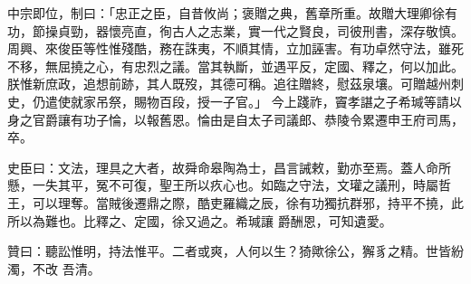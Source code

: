 \begin{pinyinscope}
 中宗即位，制曰：「忠正之臣，自昔攸尚；褒贈之典，舊章所重。故贈大理卿徐有功，節操貞勁，器懷亮直，徇古人之志業，實一代之賢良，司彼刑書，深存敬慎。周興、來俊臣等性惟殘酷，務在誅夷，不順其情，立加誣害。有功卓然守法，雖死不移，無屈撓之心，有忠烈之議。當其執斷，並遇平反，定國、釋之，何以加此。朕惟新庶政，追想前跡，其人既歿，其德可稱。追往贈終，慰茲泉壤。可贈越州刺史，仍遣使就家吊祭，賜物百段，授一子官。」
 今上踐祚，竇孝諶之子希瑊等請以身之官爵讓有功子惀，以報舊恩。惀由是自太子司議郎、恭陵令累遷申王府司馬，卒。



 史臣曰：文法，理具之大者，故舜命皋陶為士，昌言誡敕，勤亦至焉。蓋人命所懸，一失其平，冤不可復，聖王所以疚心也。如臨之守法，文瓘之議刑，時屬哲王，可以理奪。當賊後遷鼎之際，酷吏羅織之辰，徐有功獨抗群邪，持平不撓，此所以為難也。比釋之、定國，徐又過之。希瑊讓
 爵酬恩，可知遺愛。



 贊曰：聽訟惟明，持法惟平。二者或爽，人何以生？猗歟徐公，獬豸之精。世皆紛濁，不改
 吾清。



\end{pinyinscope}